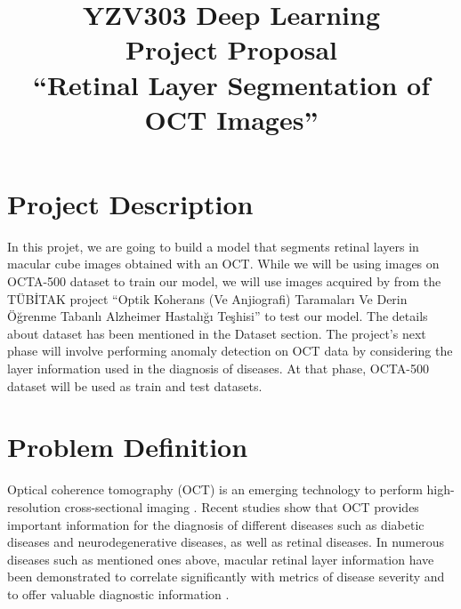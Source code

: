 \documentclass[conference]{IEEEtran}
\begin{document}
\title{
YZV303 Deep Learning \\ 
Project Proposal\\
``Retinal Layer Segmentation of OCT Images''
}

\author{
\and
{}
}

\maketitle
\vspace{-1cm}
\section{Project Description}
In this projet, we are going to build a model that segments retinal layers in macular cube images obtained with an OCT. While we will be using images on OCTA-500 dataset to train our model, we will use images acquired by from the TÜBİTAK project ``Optik Koherans (Ve Anjiografi) Taramaları Ve Derin Öğrenme Tabanlı Alzheimer Hastalığı Teşhisi'' to test our model. The details about dataset has been mentioned in the Dataset section. The project's next phase will involve performing anomaly detection on OCT data by considering the layer information used in the diagnosis of diseases. At that phase, OCTA-500 dataset will be used as train and test datasets.

\section{Problem Definition}
Optical coherence tomography (OCT) is an emerging technology to perform high-resolution cross-sectional imaging \cite{b1}. Recent studies show that OCT provides important information for the diagnosis of different diseases such as diabetic diseases and neurodegenerative diseases, as well as retinal diseases. In numerous diseases such as mentioned ones above, macular retinal layer information have been demonstrated to correlate significantly with metrics of disease severity and to offer valuable diagnostic information \cite{b2}.
\end{document}
